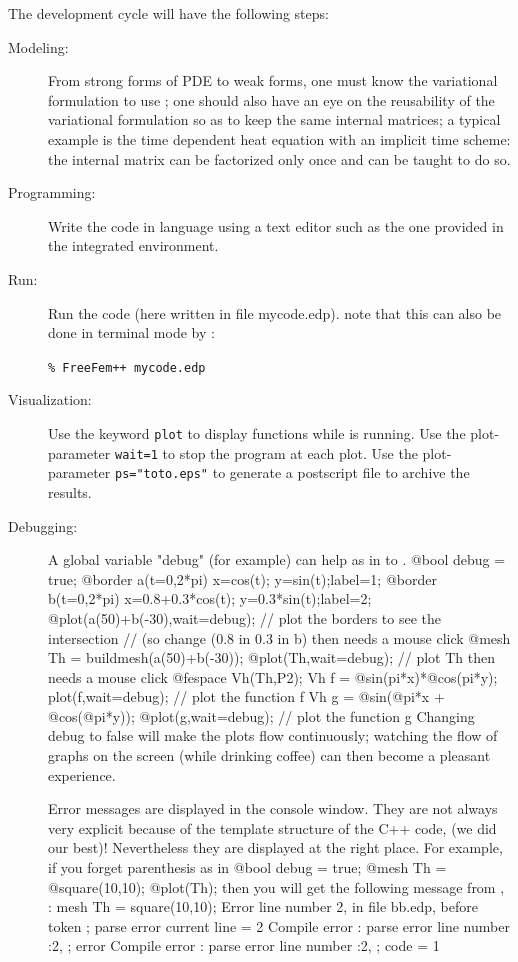 \documentclass[a4paper,twoside,12pt]{book}
\begin{document}
The development cycle will have the following steps:
\begin{description}
\item[Modeling:] From strong forms of PDE to weak forms, one must know the variational formulation
to use \freefempp; one should also have an eye on the reusability of the variational
formulation so as to keep the same internal matrices; a typical example is the
time dependent heat equation with an implicit time scheme: the internal matrix can be factorized
only once and \freefempp can be taught to do so.

\item[Programming:] Write the code in \freefempp language using a text editor such as the one
provided in the integrated environment.

\item[Run:] Run the code (here written in file mycode.edp).
note that this can also be done in terminal mode by :

\texttt{\% FreeFem++ mycode.edp}


\item[Visualization:] Use the keyword \texttt{plot} to display functions while \freefempp is running.
Use the plot-parameter \texttt{wait=1} to stop the program at each plot. Use the
plot-parameter \texttt{ps="toto.eps"} to generate a postscript file to archive the results.

\item[Debugging:] A global variable "debug" (for example) can help as in
  to .
\bFF
@bool debug = true;
@border a(t=0,2*pi){ x=cos(t); y=sin(t);label=1;}
@border b(t=0,2*pi){ x=0.8+0.3*cos(t); y=0.3*sin(t);label=2;}
@plot(a(50)+b(-30),wait=debug); // plot the borders  to see the intersection
//  (so change (0.8 in 0.3 in b) then needs a mouse click
@mesh Th = buildmesh(a(50)+b(-30));
@plot(Th,wait=debug);  // plot Th then needs a mouse click
@fespace Vh(Th,P2);
Vh f = @sin(pi*x)*@cos(pi*y);
plot(f,wait=debug);  // plot the function f
Vh g = @sin(@pi*x + @cos(@pi*y));
@plot(g,wait=debug);  // plot the function g
\eFF
Changing debug to false will make the plots flow continuously;  watching the flow of graphs
on the screen (while drinking coffee) can then become a pleasant experience.

Error messages are displayed in the console window. They are not always very explicit because of the
template structure of the C++ code, (we did our best)!  Nevertheless they are displayed at the right place.
For example, if you forget parenthesis as in
\bFF
@bool debug = true;
@mesh Th = @square(10,10);
@plot(Th);
\eFF
then you will get the following message from \freefempp,
 : mesh Th = square(10,10);
 Error line number 2, in file bb.edp, before  token ;
parse error
  current line = 2
Compile error : parse error
        line number :2, ;
error Compile error : parse error
        line number :2, ;
 code = 1


\end{description}
\end{document}
